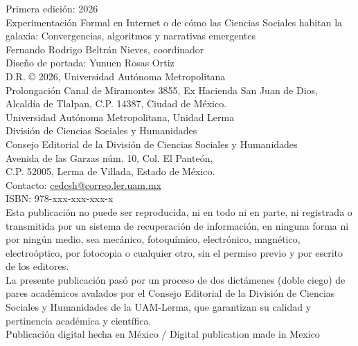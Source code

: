 \documentclass[
  spanish,
  11pt,
  a4paper,
]{scrbook}
\begin{document}
\begingroup
\begin{singlespace}
\scriptsize
\noindent
Primera edición: 2026\\
Experimentación Formal en Internet o de cómo las Ciencias Sociales habitan la galaxia: Convergencias, algoritmos y narrativas emergentes\\
Fernando Rodrigo Beltrán Nieves, coordinador\\[0.5em]
Diseño de portada: Yunuen Rosas Ortiz\\[0.5em]
D.R. © 2026, Universidad Autónoma Metropolitana\\
Prolongación Canal de Miramontes 3855, Ex Hacienda San Juan de Dios,\\
Alcaldía de Tlalpan, C.P. 14387, Ciudad de México.\\[0.5em]
{\scriptsize Universidad Autónoma Metropolitana, Unidad Lerma}\\
División de Ciencias Sociales y Humanidades\\
Consejo Editorial de la División de Ciencias Sociales y Humanidades\\
Avenida de las Garzas núm. 10, Col. El Panteón,\\
C.P. 52005, Lerma de Villada, Estado de México.\\
Contacto: \href{mailto:cedcsh@correo.ler.uam.mx}{cedcsh@correo.ler.uam.mx}\\[0.8em]
ISBN: 978-xxx-xxx-xxx-x\\[0.8em]
Esta publicación no puede ser reproducida, ni en todo ni en parte, ni registrada o transmitida por un sistema de recuperación de información, en ninguna forma ni por ningún medio, sea mecánico, fotoquímico, electrónico, magnético, electroóptico, por fotocopia o cualquier otro, sin el permiso previo y por escrito de los editores.\\[0.5em]
La presente publicación pasó por un proceso de dos dictámenes (doble ciego) de pares académicos avalados por el Consejo Editorial de la División de Ciencias Sociales y Humanidades de la UAM-Lerma, que garantizan su calidad y pertinencia académica y científica.\\[0.5em]
Publicación digital hecha en México / Digital publication made in Mexico
\end{singlespace}
\endgroup
\clearpage

\clearpage
\thispagestyle{empty}
\null
\clearpage
\end{document}
